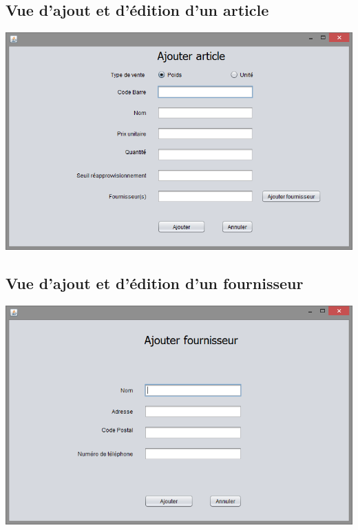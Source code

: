 \subsection{Vue d'ajout et d'édition d'un article}
\begin{center}
	\includegraphics[width=14cm]{Analyse/FormArticle.png}
\end{center}

\subsection{Vue d'ajout et d'édition d'un fournisseur}
\begin{center}
	\includegraphics[width=14cm]{Analyse/FormFournisseur.png}
\end{center}

